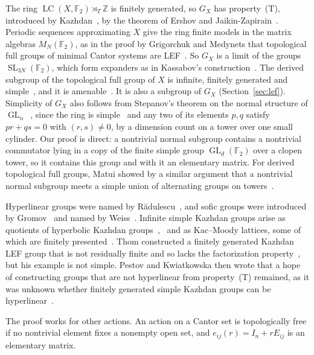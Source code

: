 \documentclass[11pt]{amsart}
\newcommand{\F}{\mathbb F}
\newcommand{\Z}{\mathbb Z}
\newcommand{\LC}{\operatorname{LC}}
\newcommand{\GL}{\operatorname{GL}}
\newcommand{\SL}{\operatorname{SL}}
\begin{document}
The ring $\LC(X,\F_2)\rtimes_T\Z$ is finitely generated, so $G_X$ has
property~\textup{(T)}, introduced by Kazhdan~\cite{Kazhdan}, by the theorem
of Ershov and Jaikin-Zapirain~\cite{EJZ}. Periodic sequences approximating
$X$ give the ring finite models in the matrix algebras $M_N(\F_2)$,
as in the proof by Grigorchuk and Medynets that topological full groups
of minimal Cantor systems are LEF~\cite[Theorem~2.6]{GM}. So $G_X$ is a
limit of the groups $\SL_{3N}(\F_2)$, which form expanders as in
Kassabov's construction~\cite{Kassabov}. The derived subgroup of the
topological full group of $X$ is infinite, finitely generated and
simple~\cite{Matui}, and it is amenable~\cite{JuschenkoMonod}. It is also a
subgroup of $G_X$ (Section~\ref{sec:lef}). Simplicity of $G_X$ also follows from Stepanov's
theorem on the normal structure of $\GL_n$~\cite[Theorem~4.4]{Stepanov},
since the ring is simple~\cite[Corollary~4.6]{ClarkEdie} and any two of
its elements $p,q$ satisfy $pr+qs=0$ with $(r,s)\ne0$, by a dimension
count on a tower over one small cylinder. Our proof is direct: a
nontrivial normal subgroup contains a nontrivial commutator lying in a
copy of the finite simple group $\GL_d(\F_2)$ over a clopen tower, so it
contains this group and with it an elementary matrix. For derived
topological full groups, Matui showed by a similar argument that a nontrivial
normal subgroup meets a simple union of alternating groups on
towers~\cite[Lemma~3.4 and Theorem~4.9]{Matui}.

Hyperlinear groups were named by R\u{a}dulescu~\cite{Radulescu}, and sofic
groups were introduced by Gromov~\cite{Gromov99} and named by
Weiss~\cite{Weiss}. Infinite simple Kazhdan groups arise as quotients of
hyperbolic Kazhdan groups~\cite{Gromov87},~\cite[Theorem~1.5]{CoulonFournierFacio} and as Kac--Moody lattices, some
of which are finitely presented~\cite{CapraceRemy}. Thom constructed a
finitely generated Kazhdan LEF group that is not residually finite and so
lacks the factorization property~\cite{Thom}, but his example is not
simple. Pestov and Kwiatkowska then wrote that a hope of constructing
groups that are not hyperlinear from property~\textup{(T)} remained, as it
was unknown whether finitely generated simple Kazhdan groups can be
hyperlinear~\cite{PestovKwiatkowska}.

The proof works for other actions. An action on a Cantor set is
topologically free if no nontrivial element fixes a nonempty open set,
and $e_{ij}(r)=I_n+rE_{ij}$ is an elementary matrix.
\end{document}
